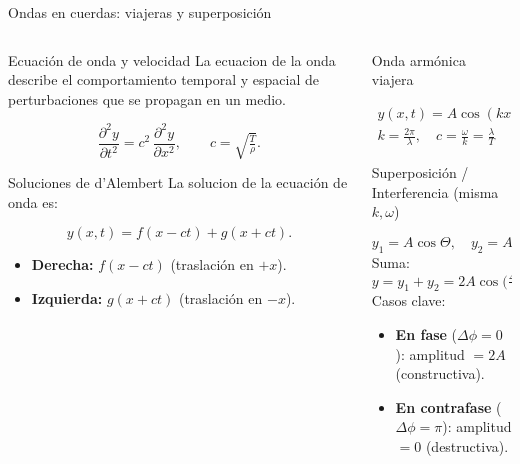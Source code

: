 \documentclass[
    10pt,
    aspectratio=169,
    xcolor={dvipsnames},
    spanish,
    ]{beamer}
\begin{document}
\begin{frame}{Ondas en cuerdas: viajeras y superposición}
  \footnotesize
  \begin{columns}[T,totalwidth=\textwidth]
    \begin{column}{0.4\textwidth}
      \begin{block}{Ecuación de onda y velocidad}
        La ecuacion de la onda describe el comportamiento temporal y espacial de perturbaciones que se propagan en un medio.
   
        \[
          \frac{\partial^{2}y}{\partial t^{2}}
          = c^{2}\,\frac{\partial^{2}y}{\partial x^{2}},
          \qquad c=\sqrt{\tfrac{T}{\rho}}.
        \]
    
      \end{block}
      \begin{block}{Soluciones de d’Alembert}
        La solucion de la ecuación de onda es:
    
        \[
          y(x,t)=f(x-ct)+g(x+ct).
        \]
        \begin{itemize}
          \item \textbf{Derecha:} $f(x-ct)$ (traslación en $+x$).
          \item \textbf{Izquierda:} $g(x+ct)$ (traslación en $-x$).
        \end{itemize}
     
      \end{block}
    \end{column}
    \begin{column}{0.5\textwidth}
      \begin{block}{Onda armónica viajera}
       
        \begin{align}
          y(x,t)=A\cos(kx-\omega t+\phi)\\
          k=\tfrac{2\pi}{\lambda},\quad c=\tfrac{\omega}{k}=\tfrac{\lambda}{T}
        \end{align}
          
      \end{block}
      \begin{block}{Superposición / Interferencia (misma $k,\omega$)}
      
        \[
          y_1=A\cos\Theta,\quad
          y_2=A\cos(\Theta+\Delta\phi),\qquad
          \Theta=kx-\omega t+\phi.
        \]
        Suma:
        \[
          y=y_1+y_2=
          2A\cos\!\Big(\tfrac{\Delta\phi}{2}\Big)\,
          \cos\!\Big(\Theta+\tfrac{\Delta\phi}{2}\Big).
        \]
        Casos clave:
        \begin{itemize}
          \item \textbf{En fase} ($\Delta\phi=0$): amplitud $=2A$ (constructiva).
          \item \textbf{En contrafase} ($\Delta\phi=\pi$): amplitud $=0$ (destructiva).
        \end{itemize}
  

\end{block}
\end{column}
\end{columns}
\end{frame}
\end{document}
